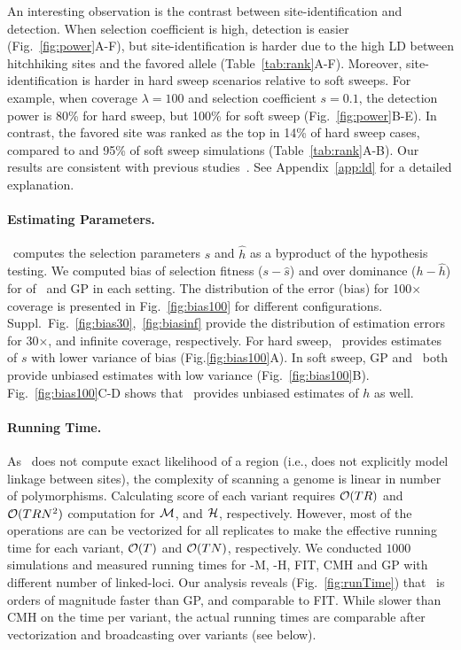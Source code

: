 An interesting observation is the contrast between site-identification
and detection. When selection coefficient is high, detection is easier
(Fig.~\ref{fig:power}A-F), but site-identification is harder due to
the high LD between hitchhiking sites and the favored allele
(Table~\ref{tab:rank}A-F).  Moreover, site-identification is harder in
hard sweep scenarios relative to soft sweeps. For example, when
coverage $\lambda=100$ and selection coefficient $s=0.1$, the
detection power is 80\% for hard sweep, but 100\% for soft sweep
(Fig.~\ref{fig:power}B-E). In contrast, the favored site was ranked as
the top in 14\% of hard sweep cases, compared to and 95\% of soft
sweep simulations (Table~\ref{tab:rank}A-B).  Our results are
consistent with previous
studies~\cite{long2013massive,tobler2014massive}. See 
Appendix~\ref{app:ld} for a detailed explanation.
 
\paragraph{Estimating Parameters.}
\comale\ computes the selection parameters $\hat{s}$ and $\hat{h}$ as
a byproduct of the hypothesis testing. We computed bias of selection
fitness ($s-\hat{s}$) and over dominance ($h-\hat{h}$) for of \comale\
and GP in each setting. The distribution of the error (bias) for
100$\times$ coverage is presented in Fig.~\ref{fig:bias100} for
different configurations.
Suppl.~Fig.~\ref{fig:bias30},~\ref{fig:biasinf} provide the
distribution of estimation errors for 30$\times$, and infinite
coverage, respectively.  For hard sweep, \comale\ provides estimates
of $s$ with lower variance of bias (Fig.\ref{fig:bias100}A). In soft
sweep, GP and \comale\ both provide unbiased estimates with low
variance (Fig.~\ref{fig:bias100}B). Fig.~\ref{fig:bias100}C-D shows
that \comale\ provides unbiased estimates of $h$ as well.

\paragraph{Running Time.}
As \comale\ does not compute exact likelihood of a region (i.e., does
not explicitly model linkage between sites), the complexity of
scanning a genome is linear in number of polymorphisms.  Calculating
score of each variant requires ${\cal O}(TR)$ and ${\cal O}(TRN^2)$ computation
for ${\cal M}$, and ${\cal H}$, respectively. However, most of the operations
are can be vectorized for all replicates to make the effective running
time for each variant, ${\cal O}(T)$ and ${\cal O}(TN)$, respectively.  We
conducted $1000$ simulations and measured running times for \comale-M,
\comale-H, FIT, CMH and GP with different number of linked-loci.  Our
analysis reveals (Fig.~\ref{fig:runTime}) that \comale\ is orders of
magnitude faster than GP, and comparable to FIT. While slower than CMH
on the time per variant, the actual running times are comparable after
vectorization and broadcasting over variants (see below).


